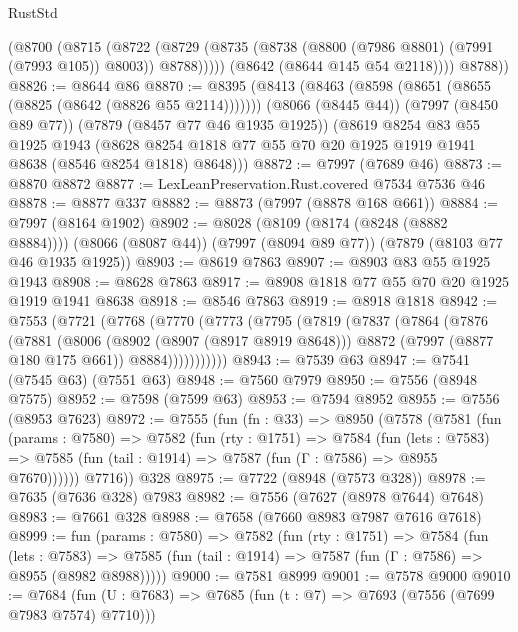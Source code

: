 \begin{lexlean}{RustStd}
\begin{coremodule}
            (@8700
              (@8715
                (@8722
                  (@8729 (@8735 (@8738 (@8800 (@7986 @8801) (@7991 (@7993 @105)) @8003)) @8788)))))
            (@8642 (@8644 @145 @54 @2118))))
        @8788))
@8826 := @8644 @86
@8870 := @8395
    (@8413
      (@8463 (@8598 (@8651 (@8655 (@8825 (@8642 (@8826 @55 @2114)))))))
      (@8066 (@8445 @44))
      (@7997 (@8450 @89 @77))
      (@7879 (@8457 @77 @46 @1935 @1925))
      (@8619
        @8254
        @83
        @55
        @1925
        @1943
        (@8628 @8254 @1818 @77 @55 @70 @20 @1925 @1919 @1941 @8638 (@8546 @8254 @1818) @8648)))
@8872 := @7997 (@7689 @46)
@8873 := @8870 @8872
@8877 := LexLeanPreservation.Rust.covered @7534 @7536 @46
@8878 := @8877 @337
@8882 := @8873 (@7997 (@8878 @168 @661))
@8884 := @7997 (@8164 @1902)
@8902 := @8028
    (@8109 (@8174 (@8248 (@8882 @8884))))
    (@8066 (@8087 @44))
    (@7997 (@8094 @89 @77))
    (@7879 (@8103 @77 @46 @1935 @1925))
@8903 := @8619 @7863
@8907 := @8903 @83 @55 @1925 @1943
@8908 := @8628 @7863
@8917 := @8908 @1818 @77 @55 @70 @20 @1925 @1919 @1941 @8638
@8918 := @8546 @7863
@8919 := @8918 @1818
@8942 := @7553
    (@7721
      (@7768
        (@7770
          (@7773
            (@7795
              (@7819
                (@7837
                  (@7864
                    (@7876
                      (@7881
                        (@8006
                          (@8902 (@8907 (@8917 @8919 @8648)))
                          @8872
                          (@7997 (@8877 @180 @175 @661))
                          @8884)))))))))))
@8943 := @7539 @63
@8947 := @7541 (@7545 @63) (@7551 @63)
@8948 := @7560 @7979
@8950 := @7556 (@8948 @7575)
@8952 := @7598 (@7599 @63)
@8953 := @7594 @8952
@8955 := @7556 (@8953 @7623)
@8972 := @7555
    (fun (fn : @33) =>
    @8950
      (@7578
        (@7581
          (fun (params : @7580) =>
          @7582
            (fun (rty : @1751) =>
            @7584
              (fun (lets : @7583) =>
              @7585 (fun (tail : @1914) => @7587 (fun (Γ : @7586) => @8955 @7670))))))
        @7716))
    @328
@8975 := @7722 (@8948 (@7573 @328))
@8978 := @7635 (@7636 @328) @7983
@8982 := @7556 (@7627 (@8978 @7644) @7648)
@8983 := @7661 @328
@8988 := @7658 (@7660 @8983 @7987 @7616 @7618)
@8999 := fun (params : @7580) =>
  @7582
    (fun (rty : @1751) =>
    @7584
      (fun (lets : @7583) =>
      @7585 (fun (tail : @1914) => @7587 (fun (Γ : @7586) => @8955 (@8982 @8988)))))
@9000 := @7581 @8999
@9001 := @7578 @9000
@9010 := @7684 (fun (U : @7683) => @7685 (fun (t : @7) => @7693 (@7556 (@7699 @7983 @7574) @7710)))

\end{coremodule}
\end{lexlean}
